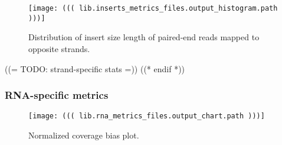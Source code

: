 {
    \begin{figure}[h!]
        \centering
        \texttt{[image: ((( lib.inserts\_metrics\_files.output\_histogram.path )))]}
        \caption{Distribution of insert size length of paired-end reads mapped to opposite strands.}
    \end{figure}
}
((= TODO: strand-specific stats
=))
((* endif *))

\subsubsection{RNA-specific metrics}

{
    \begin{figure}[h!]
        \centering
        \texttt{[image: ((( lib.rna\_metrics\_files.output\_chart.path )))]}
        \caption{Normalized coverage bias plot.}
    \end{figure}
}

